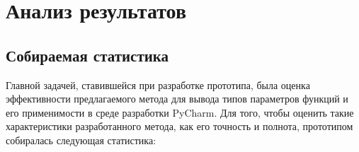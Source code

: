\chapter{Анализ результатов}

\section{Собираемая статистика}
\label{sec:statistics-collecting}

Главной задачей, ставившейся при разработке прототипа, была оценка эффективности
предлагаемого метода для вывода типов параметров функций и его применимости в
среде разработки PyCharm. Для того, чтобы оценить такие характеристики
разработанного метода, как его точность и полнота, прототипом собиралась
следующая статистика:

